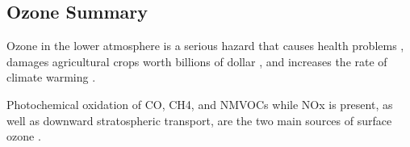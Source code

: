 \subsection{Ozone Summary}
Ozone in the lower atmosphere is a serious hazard that causes health problems \cite{Hsieh_2013}, damages agricultural crops worth billions of dollar \cite{Avnery_2011}, and increases the rate of climate warming \cite{IPCC_2013_chap8}.
  
Photochemical oxidation of CO, CH4, and NMVOCs while NOx is present, as well as downward stratospheric transport, are the two main sources of surface ozone \cite{Mahajan_2015}.

